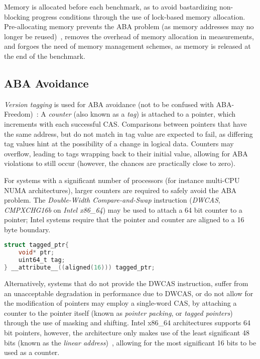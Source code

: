 Memory is allocated before each benchmark, as to avoid bastardizing
non-blocking progress conditions through the use of lock-based memory
allocation. Pre-allocating memory prevents the ABA problem (as memory addresses
may no longer be reused)~\citep{dechev2010understanding}, removes the overhead
of memory allocation in measurements, and forgoes the need of memory management
schemes, as memory is released at the end of the benchmark.

\subsection{ABA Avoidance}

\emph{Version tagging} is used for ABA avoidance (not to be confused with
ABA-Freedom)~\citep{dechev2010understanding}:
A \emph{counter} (also known as a \emph{tag}) is attached to a pointer, which increments with
each successful CAS. Comparisons between pointers that have the same address,
but do not match in tag value are expected to fail, as differing tag values hint
at the possibility of a change in logical data. Counters may overflow, leading to tags wrapping back
to their initial value, allowing for ABA violations to still occur (however,
the chances are practically close to zero).

For systems with a significant number of processors (for instance multi-CPU NUMA
architectures), larger counters are required  to safely avoid the ABA problem.
The \emph{Double-Width Compare-and-Swap} instruction (\emph{DWCAS}, \emph{CMPXCHG16b} on
\emph{Intel x86\_64}) may be used to attach a 64 bit counter to a pointer; Intel
systems require that the pointer and counter are aligned to a 16 byte boundary.

\begin{lstlisting}[language=C,caption={Struct aligned to 16 bytes in order to be used with DWCAS.}]
struct tagged_ptr{
    void* ptr;
    uint64_t tag;
} __attribute__((aligned(16))) tagged_ptr;
\end{lstlisting}

Alternatively, systems that do not provide the DWCAS instruction, suffer from
an unacceptable degradation in performance due to DWCAS, or do not allow for
the modification of pointers may employ a single-word CAS, by attaching a
counter to the pointer itself (known as \emph{pointer packing}, or \emph{tagged
pointers}) through the use of masking and shifting. Intel x86\_64 architectures supports 64 bit pointers, however, the
architecture only makes use of the least significant 48 bits (known as the
\emph{linear address})~\citep[Section~3.3.7.1]{intel2021system}, allowing for
the most significant 16 bits to be used as a counter.

